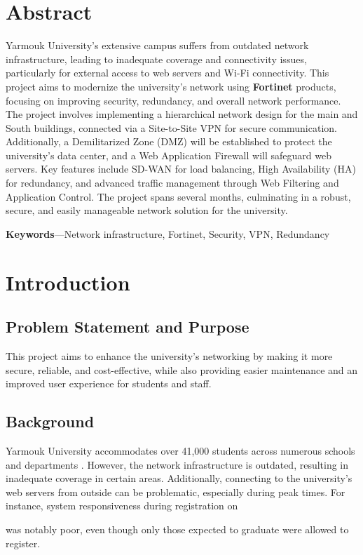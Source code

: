 \documentclass[12pt]{report}
\begin{document}
\newpage
\tableofcontents
\newpage
\listoftables
\newpage
\listoffigures

\newpage
\chapter*{Abstract}
Yarmouk University's extensive campus suffers from outdated network infrastructure, leading to inadequate coverage and connectivity issues, particularly for external access to web servers and Wi-Fi connectivity. This project aims to modernize the university's network using \textbf{Fortinet} products, focusing on improving security, redundancy, and overall network performance. The project involves implementing a hierarchical network design for the main and South buildings, connected via a Site-to-Site VPN for secure communication. Additionally, a Demilitarized Zone (DMZ) will be established to protect the university’s data center, and a Web Application Firewall will safeguard web servers. Key features include SD-WAN for load balancing, High Availability (HA) for redundancy, and advanced traffic management through Web Filtering and Application Control. The project spans several months, culminating in a robust, secure, and easily manageable network solution for the university.

\textbf{Keywords}—Network infrastructure, Fortinet, Security, VPN, Redundancy

\clearpage
{}
\chapter{Introduction}
\section{Problem Statement and Purpose}
This project aims to enhance the university's networking by making it more secure, reliable, and cost-effective, while also providing easier maintenance and an improved user experience for students and staff.

\section{Background}
Yarmouk University accommodates over 41,000 students across numerous schools and departments \cite{YU}. However, the network infrastructure is outdated, resulting in inadequate coverage in certain areas. Additionally, connecting to the university's web servers from outside can be problematic, especially during peak times. For instance, system responsiveness during registration on \date{19th of May, 2024} was notably poor, even though only those expected to graduate were allowed to register.
\end{document}
